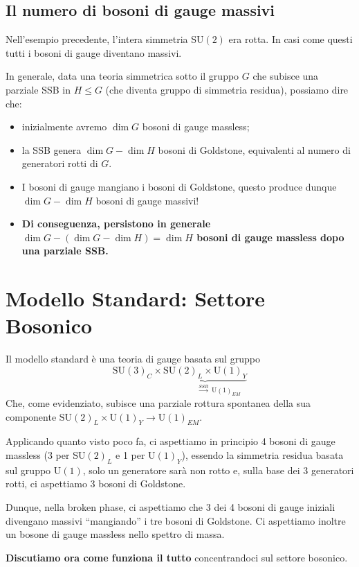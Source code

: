 \documentclass[../main.tex]{subfiles}
\begin{document}
\subsection{Il numero di bosoni di gauge massivi}

Nell'esempio precedente, l'intera simmetria SU$(2)$ era rotta. In casi come questi tutti i bosoni di gauge diventano massivi.

In generale, data una teoria simmetrica sotto il gruppo $G$ che subisce una parziale SSB in $H\leq G$ (che diventa gruppo di simmetria residua), possiamo dire che:
\begin{itemize}
    \item inizialmente avremo $\dim G$ bosoni di gauge massless;
    \item la SSB genera $\dim G - \dim H$ bosoni di Goldstone, equivalenti al numero di generatori rotti di $G$.
    \item I bosoni di gauge mangiano i bosoni di Goldstone, questo produce dunque $\dim G - \dim H$ bosoni di gauge massivi!
    \item \textbf{Di conseguenza, persistono in generale $\dim G - (\dim G - \dim H) = \dim H$ bosoni di gauge massless dopo una parziale SSB.}
\end{itemize}



\section{Modello Standard: Settore Bosonico}

Il modello standard è una teoria di gauge basata sul gruppo 
\[
\boxed{\text{SU}(3)_C\times\underbrace{\text{SU}(2)_L\times\text{U}(1)_Y}_{\quad\quad\quad\quad\xrightarrow{SSB} ~{\text{U}(1)_{EM}}}}
\]
Che, come evidenziato, subisce una parziale rottura spontanea della sua componente $\text{SU}(2)_L\times\text{U}(1)_Y \rightarrow \text{U}(1)_{EM}$.

Applicando quanto visto poco fa, ci aspettiamo in principio 4 bosoni di gauge massless (3 per SU$(2)_L$ e 1 per U$(1)_Y$), essendo la simmetria residua basata sul gruppo U$(1)$, solo un generatore sarà non rotto e, sulla base dei 3 generatori rotti, ci aspettiamo 3 bosoni di Goldstone.

Dunque, nella broken phase, ci aspettiamo che 3 dei 4 bosoni di gauge iniziali divengano massivi “mangiando” i tre bosoni di Goldstone. Ci aspettiamo inoltre un bosone di gauge massless nello spettro di massa.

\textbf{Discutiamo ora come funziona il tutto} concentrandoci sul settore bosonico.
\end{document}
